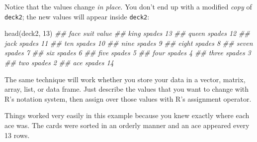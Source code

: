 \documentclass[
  letterpaper,
  DIV=11,
  numbers=noendperiod]{scrbook}
\newenvironment{Shaded}{\begin{snugshade}}{\end{snugshade}}
\newcommand{\CommentTok}[1]{\textcolor[rgb]{0.37,0.37,0.37}{#1}}
\newcommand{\DecValTok}[1]{\textcolor[rgb]{0.68,0.00,0.00}{#1}}
\newcommand{\DocumentationTok}[1]{\textcolor[rgb]{0.37,0.37,0.37}{\textit{#1}}}
\newcommand{\FunctionTok}[1]{\textcolor[rgb]{0.28,0.35,0.67}{#1}}
\newcommand{\NormalTok}[1]{\textcolor[rgb]{0.00,0.23,0.31}{#1}}
\newcommand{\OtherTok}[1]{\textcolor[rgb]{0.00,0.23,0.31}{#1}}
\newcommand{\SpecialCharTok}[1]{\textcolor[rgb]{0.37,0.37,0.37}{#1}}
\begin{document}
\begin{Shaded}
\end{Shaded}

Notice that the values change \emph{in place}. You don't end up with a
modified \emph{copy} of \texttt{deck2}; the new values will appear
inside \texttt{deck2}:

\begin{Shaded}
\begin{Highlighting}[]
\FunctionTok{head}\NormalTok{(deck2, }\DecValTok{13}\NormalTok{)}
\DocumentationTok{\#\#   face   suit value}
\DocumentationTok{\#\#   king spades    13}
\DocumentationTok{\#\#  queen spades    12}
\DocumentationTok{\#\#   jack spades    11}
\DocumentationTok{\#\#    ten spades    10}
\DocumentationTok{\#\#   nine spades     9}
\DocumentationTok{\#\#  eight spades     8}
\DocumentationTok{\#\#  seven spades     7}
\DocumentationTok{\#\#    six spades     6}
\DocumentationTok{\#\#   five spades     5}
\DocumentationTok{\#\#   four spades     4}
\DocumentationTok{\#\#  three spades     3}
\DocumentationTok{\#\#    two spades     2}
\DocumentationTok{\#\#    ace spades    14}
\end{Highlighting}
\end{Shaded}

The same technique will work whether you store your data in a vector,
matrix, array, list, or data frame. Just describe the values that you
want to change with R's notation system, then assign over those values
with R's assignment operator.

Things worked very easily in this example because you knew exactly where
each ace was. The cards were sorted in an orderly manner and an ace
appeared every 13 rows.
\end{document}

